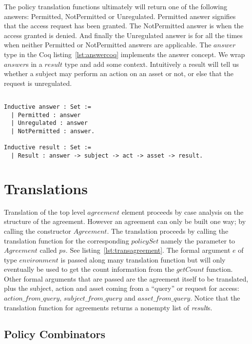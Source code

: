The policy translation functions ultimately will return one of the following answers: Permitted, NotPermitted or Unregulated. Permitted answer signifies that the access request has been granted. The NotPermitted answer is when the access granted is denied. And finally the Unregulated answer is for all the times when neither Permitted or NotPermitted answers are applicable. The $answer$ type in the Coq listing~\ref{lst:answercoq} implements the answer concept. We wrap $answer$s in a $result$ type and add some context. Intuitively a result will tell us whether a subject may perform an action on an asset or not, or else that the request is unregulated.


\begin{minipage}[c]{0.95\textwidth}
\begin{lstlisting}

Inductive answer : Set :=
  | Permitted : answer
  | Unregulated : answer
  | NotPermitted : answer.
  
Inductive result : Set :=
  | Result : answer -> subject -> act -> asset -> result.
\end{lstlisting}
\end{minipage}

\section{Translations}


Translation of the top level $agreement$ element proceeds by case analysis on the structure of the agreement. However an agreement can only be built one way; by calling the constructor $Agreement$. The translation proceeds by calling the translation function for the corresponding $policySet$ namely the parameter to $Agreement$ called $ps$. See listing~\ref{lst:transagreement}. The formal argument $e$ of type $environment$ is passed along many translation function but will only eventually be used to get the count information from the $getCount$ function. Other formal arguments that are passed are the agreement itself to be translated, plus the subject, action and asset coming from a ``query'' or request for access: $action\_from\_query$, $subject\_from\_query$ and $asset\_from\_query$. Notice that the translation function for agreements returns a nonempty list of \emph{result}s.

\subsection{Policy Combinators}\label{subsec:policycombinators}

